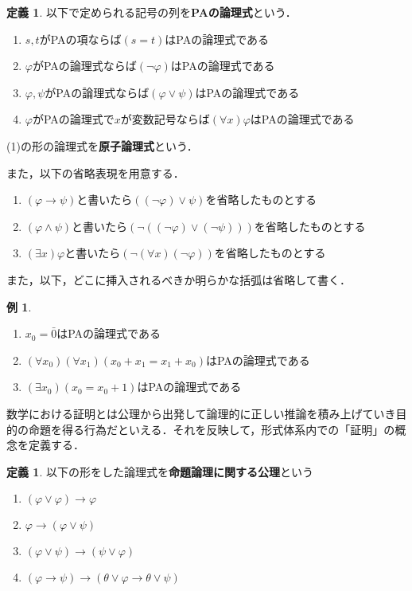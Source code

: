 \documentclass[uplatex]{jsarticle}
\theoremstyle{definition} %
\newtheorem{defi}[thm]{定義}
\newtheorem{exm}[thm]{例}
\begin{document}
\begin{defi}
以下で定められる記号の列を{\bfseries PAの論理式}という．
\begin{enumerate}
\item $s, t$がPAの項ならば$(s = t)$はPAの論理式である
\item $\varphi$がPAの論理式ならば$(\neg \varphi)$はPAの論理式である
\item $\varphi, \psi$がPAの論理式ならば$(\varphi \lor \psi)$はPAの論理式である
\item $\varphi$がPAの論理式で$x$が変数記号ならば$(\forall x) \varphi$はPAの論理式である
\end{enumerate}
(1)の形の論理式を{\bfseries 原子論理式}という．

また，以下の省略表現を用意する．
\begin{enumerate}
\item $(\varphi \to \psi)$と書いたら$((\neg \varphi) \lor \psi)$を省略したものとする
\item $(\varphi \land \psi)$と書いたら$(\neg ((\neg \varphi) \lor (\neg \psi)))$を省略したものとする
\item $(\exists x) \varphi$と書いたら$(\neg (\forall x) (\neg \varphi))$を省略したものとする
\end{enumerate}

また，以下，どこに挿入されるべきか明らかな括弧は省略して書く．
\end{defi}

\begin{exm}\leavevmode
\begin{enumerate}
\item $x_0 = \bar{0}$はPAの論理式である
\item $(\forall x_0) (\forall x_1) (x_0 + x_1 = x_1 + x_0)$はPAの論理式である
\item $(\exists x_0) (x_0 = x_0 + 1)$はPAの論理式である
\end{enumerate}
\end{exm}

数学における証明とは公理から出発して論理的に正しい推論を積み上げていき目的の命題を得る行為だといえる．それを反映して，形式体系内での「証明」の概念を定義する．

\begin{defi}
以下の形をした論理式を{\bfseries 命題論理に関する公理}という
\begin{enumerate}
\item $(\varphi \lor \varphi) \to \varphi$
\item $\varphi \to (\varphi \lor \psi)$
\item $(\varphi \lor \psi) \to (\psi \lor \varphi)$
\item $(\varphi \to \psi) \to (\theta \lor \varphi \to \theta \lor \psi)$
\end{enumerate}
\end{defi}
\end{document}
